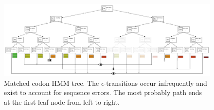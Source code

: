 \documentclass[a4paper]{article}
\theoremstyle{definition}
\theoremstyle{definition}
\theoremstyle{definition}
\newcommand{\eps}{\epsilon}
\newcommand{\gv}{\;|\;}
\begin{document}

\begin{figure}
    \centering
    \includegraphics[scale=0.9]{codon-hmm-tree}
    \caption{Matched codon HMM tree.
        The $\eps$-transitions occur infrequently and exist to account for sequence errors.
        The most probably path ends at the first leaf-node from left to right.}\label{fig:codon-hmm-tree}
\end{figure}
\end{document}
